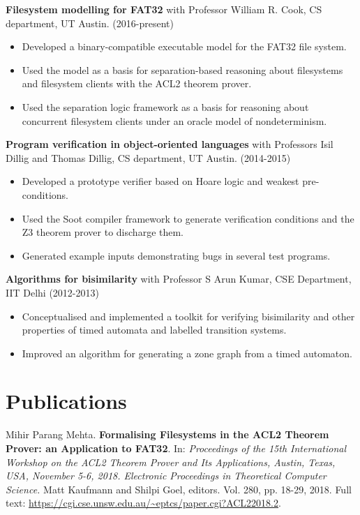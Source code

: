 \documentclass[margin]{res}
\begin{document}
\begin{resume}
 {\bf Filesystem modelling for FAT32} with Professor William R. Cook, CS department, UT Austin. \hfill (2016-present)
 \begin{itemize} \itemsep -2pt  %
 \item Developed a binary-compatible executable model for the FAT32 file system.
 \item Used the model as a basis for separation-based reasoning about
   filesystems and filesystem clients with the ACL2 theorem prover.
 \item Used the separation logic framework as a basis for reasoning
   about concurrent filesystem clients under an oracle model of
   nondeterminism.
 \end{itemize}

 {\bf Program verification in object-oriented languages} with Professors Isil Dillig and Thomas
 Dillig, CS department, UT Austin. \hfill (2014-2015)
 \begin{itemize} \itemsep -2pt  %
 \item Developed a prototype verifier based on Hoare logic and weakest
   pre-conditions.
 \item Used the Soot compiler framework to generate
   verification conditions and the Z3 theorem prover to discharge them.
 \item Generated example
   inputs demonstrating bugs in several test programs.
 \end{itemize}

 {\bf Algorithms for bisimilarity} with Professor S
 Arun Kumar, CSE Department, IIT Delhi    \hfill
 (2012-2013)
 \begin{itemize} \itemsep -2pt
 \item Conceptualised and implemented a toolkit for
   verifying bisimilarity and other properties of timed automata
   and labelled transition systems.
 \item Improved an algorithm for generating a zone
   graph from a timed automaton.

 \end{itemize}

\section{Publications}
  Mihir Parang Mehta. {\bf Formalising Filesystems in the ACL2 Theorem
    Prover: an Application to FAT32}. In: \textit{Proceedings of the
    15th International Workshop on the ACL2 Theorem Prover and Its
    Applications, Austin, Texas, USA, November 5-6, 2018. Electronic
    Proceedings in Theoretical Computer Science.}  Matt Kaufmann and
  Shilpi Goel, editors.  Vol.  280, pp. 18-29, 2018. Full text:
  \url{https://cgi.cse.unsw.edu.au/~eptcs/paper.cgi?ACL22018.2}.


\end{resume}
\end{document}
